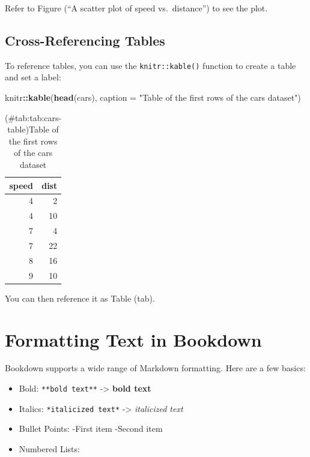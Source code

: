 \documentclass[
]{book}
\newenvironment{Shaded}{\begin{snugshade}}{\end{snugshade}}
\newcommand{\AttributeTok}[1]{\textcolor[rgb]{0.13,0.29,0.53}{#1}}
\newcommand{\FunctionTok}[1]{\textcolor[rgb]{0.13,0.29,0.53}{\textbf{#1}}}
\newcommand{\NormalTok}[1]{#1}
\newcommand{\SpecialCharTok}[1]{\textcolor[rgb]{0.81,0.36,0.00}{\textbf{#1}}}
\newcommand{\StringTok}[1]{\textcolor[rgb]{0.31,0.60,0.02}{#1}}
\theoremstyle{definition}
\theoremstyle{definition}
\theoremstyle{definition}
\theoremstyle{definition}
\theoremstyle{remark}
\begin{document}
Refer to Figure \citet{ref}(``A scatter plot of speed vs.~distance'') to see the plot.

\subsection{Cross-Referencing Tables}\label{cross-referencing-tables}

To reference tables, you can use the \texttt{knitr::kable()} function to create a table and set a label:

\begin{Shaded}
\begin{Highlighting}[]
\NormalTok{knitr}\SpecialCharTok{::}\FunctionTok{kable}\NormalTok{(}\FunctionTok{head}\NormalTok{(cars), }\AttributeTok{caption =} \StringTok{"Table of the first rows of the cars dataset"}\NormalTok{)}
\end{Highlighting}
\end{Shaded}

\begin{table}

\caption{(\#tab:tab:cars-table)Table of the first rows of the cars dataset}
\centering
\begin{tabular}[t]{r|r}
\hline
speed & dist\\
\hline
4 & 2\\
\hline
4 & 10\\
\hline
7 & 4\\
\hline
7 & 22\\
\hline
8 & 16\\
\hline
9 & 10\\
\hline
\end{tabular}
\end{table}

You can then reference it as Table \citet{ref}(tab).

\section{Formatting Text in Bookdown}\label{formatting-text-in-bookdown}

Bookdown supports a wide range of Markdown formatting. Here are a few basics:

\begin{itemize}
\item
  Bold: \texttt{**bold\ text**} -\textgreater{} \textbf{bold text}
\item
  Italics: \texttt{*italicized\ text*} -\textgreater{} \emph{italicized text}
\item
  Bullet Points:
  -First item
  -Second item
\item
  Numbered Lists:
\end{itemize}
\end{document}
